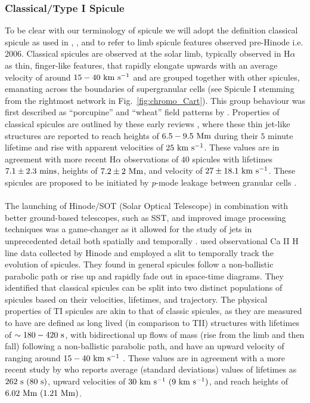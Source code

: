\documentclass[12pt]{ociamthesis}
\newcommand{\kms}{~\rm{km ~s^{-1}}}
\newcommand{\np}{\\ \\}
\begin{document}
\subsubsection{Classical/Type I Spicule}
\label{subsec:TI}
To be clear with our terminology of spicule we will adopt the definition classical spicule as used in \cite{Sterling2010ApJ7221644S}, \cite{Pereira2013ApJ76469P}, and \cite{Sterling2020ApJ893L45S} to refer to limb spicule features observed pre-Hinode i.e. 2006. Classical spicules are observed at the solar limb, typically observed in H$\alpha$ as thin, finger-like features, that rapidly elongate upwards with an average velocity of around $15-40\kms$ \citep{Pontieu2007PASJ} and are grouped together with other spicules, emanating across the boundaries of supergranular cells (see Spicule I stemming from the rightmost network in Fig.~\ref{fig:chromo_Cart}). This group behaviour was first described as “porcupine” and “wheat” field patterns by \cite{Lippincott1957SCoA215L}. Properties of classical spicules are outlined by these early reviews \cite{Beckers1968,Beckers1972ARA&A}, where these thin jet-like structures are reported to reach heights of $6.5-9.5~\rm{Mm}$ during their $5$ minute lifetime and rise with apparent velocities of $25\kms$. These values are in agreement with more recent H$\alpha$ observations of $40$ spicules with lifetimes $7.1\pm2.3~\rm{mins}$, heights of $7.2\pm2~\rm{Mm}$, and velocity of $27\pm18.1\kms$. These spicules are proposed to be initiated by \textit{p}-mode leakage between granular cells \citep{Pontieu2004Natur}. \np
%
The launching of Hinode/SOT (Solar Optical Telescope) in combination with better ground-based telescopes, such as SST, and improved image processing techniques was a game-changer as it allowed for the study of jets in unprecedented detail both spatially and temporally \citep{Aschwanden2010SoPh262235A}. \cite{Pontieu2007PASJ} used observational Ca II H line data collected by Hinode and employed a slit to temporally track the evolution of spicules. They found in general spicules follow a non-ballistic parabolic path or rise up and rapidly fade out in space-time diagrams. They identified that classical spicules can be split into two distinct populations of spicules based on their velocities, lifetimes, and trajectory. The physical properties of TI spicules are akin to that of classic spicules, as they are measured to have are defined as long lived (in comparison to TII) structures with lifetimes of $\sim 180-420~\rm{s}$, with bidirectional up flows of mass (rise from the limb and then fall) following a non-ballistic parabolic path, and have an upward velocity of ranging around $15-40\kms$ \citep{Pontieu2007PASJ}. These values are in agreement with a more recent study by \cite{Pereira2012} who reports average (standard deviations) values of lifetimes as $262~\rm{s}~(80~\rm{s})$, upward velocities of $30\kms~(9\kms)$, and reach heights of $6.02~\rm{Mm}~(1.21~\rm{Mm})$. \np
\end{document}
